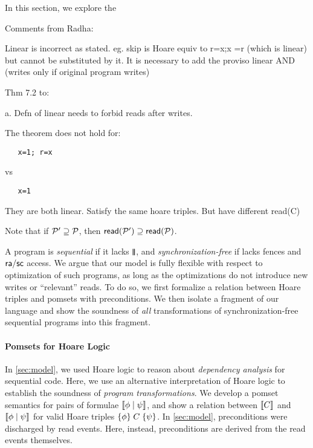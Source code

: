 In this section, we explore the 

Comments from Radha:

Linear is incorrect as stated. eg. skip is Hoare equiv to r=x;x =r (which is
linear) but cannot be substituted by it.  It is necessary to add the proviso
linear AND (writes only if original program writes)

Thm 7.2 to:

    
a. Defn of linear needs to forbid reads after writes. 

The theorem does not hold for:
\begin{verbatim}
   x=1; r=x
\end{verbatim}
vs
\begin{verbatim}
   x=1
\end{verbatim}
They are both linear. Satisfy the same hoare triples.  But have different
read(C)




Note that if $\mathcal{P}'\supseteq\mathcal{P}$, then
${\mathsf{read}}(\mathcal{P}')\supseteq {\mathsf{read}}(\mathcal{P})$.


A program is \emph{sequential} if it lacks $\!\!\,\mathbin{\texttt{\textbf{|}}\mkern-6mu\texttt{\textbf{|}}}\,\!\!$, and
\emph{synchronization-free} if lacks fences and ${\mathsf{ra}}/{\mathsf{sc}}$ access.  We
argue that our model is fully flexible with respect to optimization of such
programs, as long as the optimizations do not introduce new writes or
``relevant'' reads.  To do so, we first formalize a
relation between Hoare triples and pomsets with preconditions.
We then isolate a fragment of our
language and show
the soundness of {\em all} transformations of synchronization-free sequential
programs into this fragment.

%
\paragraph{Pomsets for Hoare Logic}
In \textsection\ref{sec:model}, we used Hoare logic
\cite{Hoare:1969:ABC:363235.363259,gordonHoare} to reason about
\emph{dependency analysis} for sequential code.  Here, we use an alternative
interpretation of Hoare logic to establish the soundness of \emph{program
  transformations}.  We develop a pomset semantics for pairs of formulae
$\llbracket\phi\mid\psi\rrbracket$, and show a relation between $\llbracket C\rrbracket$ and
$\llbracket\phi\mid\psi\rrbracket$ for valid Hoare triples
$\{\phi\}\allowbreak\;C\;\allowbreak\{\psi\}$.  In \textsection\ref{sec:model},
preconditions were discharged by read events.  Here, instead, preconditions
are derived from the read events themselves.

